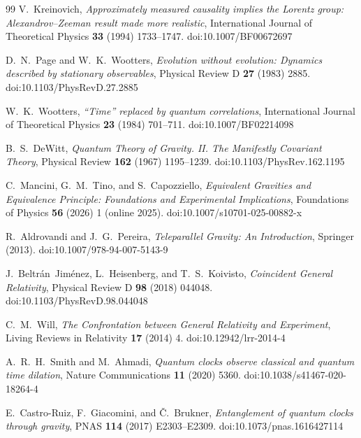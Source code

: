 \documentclass[11pt,a4paper]{article}
\theoremstyle{thmstyleone}
\theoremstyle{thmstyletwo}
\theoremstyle{thmstylethree}
\begin{document}
\begin{thebibliography}{99}
        V.~Kreinovich,
        \textit{Approximately measured causality implies the Lorentz group: Alexandrov--Zeeman result made more realistic},
        International Journal of Theoretical Physics \textbf{33} (1994) 1733--1747.
        doi:10.1007/BF00672697

        D.~N.~Page and W.~K.~Wootters,
        \textit{Evolution without evolution: Dynamics described by stationary observables},
        Physical Review D \textbf{27} (1983) 2885.
        doi:10.1103/PhysRevD.27.2885

        W.~K.~Wootters,
        \textit{``Time'' replaced by quantum correlations},
        International Journal of Theoretical Physics \textbf{23} (1984) 701--711.
        doi:10.1007/BF02214098

        B.~S.~DeWitt,
        \textit{Quantum Theory of Gravity. II. The Manifestly Covariant Theory},
        Physical Review \textbf{162} (1967) 1195--1239.
        doi:10.1103/PhysRev.162.1195

        C.~Mancini, G.~M.~Tino, and S.~Capozziello,
        \textit{Equivalent Gravities and Equivalence Principle: Foundations and Experimental Implications},
        Foundations of Physics \textbf{56} (2026) 1 (online 2025).
        doi:10.1007/s10701-025-00882-x

        R.~Aldrovandi and J.~G.~Pereira,
        \textit{Teleparallel Gravity: An Introduction},
        Springer (2013).
        doi:10.1007/978-94-007-5143-9

        J.~Beltr\'an~Jim\'enez, L.~Heisenberg, and T.~S.~Koivisto,
        \textit{Coincident General Relativity},
        Physical Review D \textbf{98} (2018) 044048.
        doi:10.1103/PhysRevD.98.044048

        C.~M.~Will,
        \textit{The Confrontation between General Relativity and Experiment},
        Living Reviews in Relativity \textbf{17} (2014) 4.
        doi:10.12942/lrr-2014-4

        A.~R.~H.~Smith and M.~Ahmadi,
        \textit{Quantum clocks observe classical and quantum time dilation},
        Nature Communications \textbf{11} (2020) 5360.
        doi:10.1038/s41467-020-18264-4

        E.~Castro-Ruiz, F.~Giacomini, and \v{C}.~Brukner,
        \textit{Entanglement of quantum clocks through gravity},
        PNAS \textbf{114} (2017) E2303--E2309.
        doi:10.1073/pnas.1616427114


\end{thebibliography}
\end{document}
